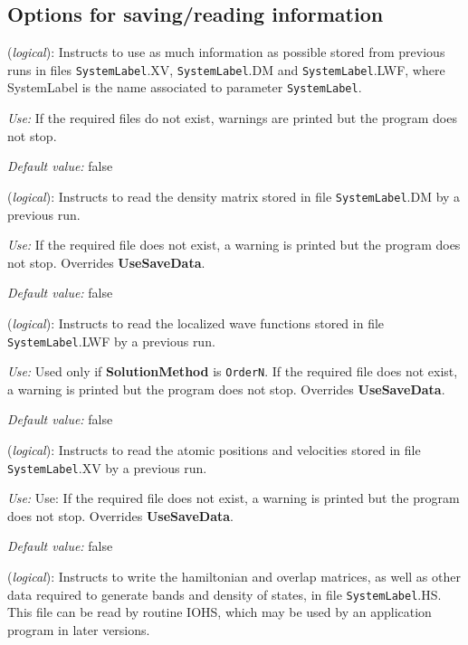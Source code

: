 \vspace{5pt}
\subsection{Options for saving/reading information}

\begin{description}
\itemsep 10pt
\parsep 0pt


\item[{\bf UseSaveData}] ({\it logical}): 
Instructs to use as much information as possible stored from
previous runs in files {\tt SystemLabel}.XV, {\tt SystemLabel}.DM and
{\tt SystemLabel}.LWF, where SystemLabel is the name associated
to parameter {\tt SystemLabel}.

{\it Use:} If the required files do not exist, warnings are
printed but the program does not stop.

{\it Default value:} false
        

\item[{\bf DM.UseSaveDM}] ({\it logical}): 
Instructs to read the density matrix stored in file
{\tt SystemLabel}.DM by a previous run.

{\it Use:} If the required file does not exist, a warning is
printed but the program does not stop. Overrides {\bf UseSaveData}.

{\it Default value:} false


\item[{\bf ON.UseSaveLWF}] ({\it logical}): 
Instructs to read the localized wave functions stored in file
{\tt SystemLabel}.LWF by a previous run.

{\it Use:} Used only if {\bf SolutionMethod} is {\tt OrderN}.
If the required file does not exist, a warning is
printed but the program does not stop. Overrides {\bf UseSaveData}.

{\it Default value:} false


\item[{\bf MD.UseSaveXV}] ({\it logical}): 
Instructs to read the atomic positions and velocities stored 
in file {\tt SystemLabel}.XV by a previous run.

{\it Use:} Use: If the required file does not exist, a warning is
printed but the program does not stop. Overrides {\bf UseSaveData}.

{\it Default value:} false
        

\item[{\bf SaveHS}] ({\it logical}): 
Instructs to write the hamiltonian and overlap matrices, as well
as other data required to generate bands and density of states,
in file {\tt SystemLabel}.HS. This file can be read by routine IOHS,
which may be used by an application program in later versions.


\end{description}
